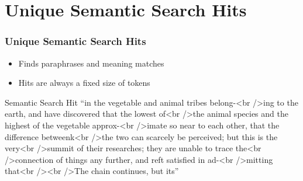 \documentclass[pdf]{beamer}
\begin{document}
\section{Unique Semantic Search Hits}


\begin{frame}
  \frametitle{Unique Semantic Search Hits}
  \begin{itemize}
    \item Finds paraphrases and meaning matches
    \item Hits are always a fixed size of tokens
  \end{itemize}
  \begin{block}{Semantic Search Hit}
    ``in the vegetable and animal tribes belong-\textless{}br /\textgreater{}ing to the earth, and have discovered that the lowest of\textless{}br /\textgreater{}the animal species and the highest of the vegetable approx-\textless{}br /\textgreater{}imate so near to each other, that the difference betweenk\textless{}br /\textgreater{}the two can scarcely be perceived; but this is the very\textless{}br /\textgreater{}summit of their researches; they are unable to trace the\textless{}br /\textgreater{}connection of things any further, and reft satisfied in ad-\textless{}br /\textgreater{}mitting that\textless{}br /\textgreater{}\textless{}br /\textgreater{}The chain continues, but its''
  \end{block}
\end{frame}
\end{document}
